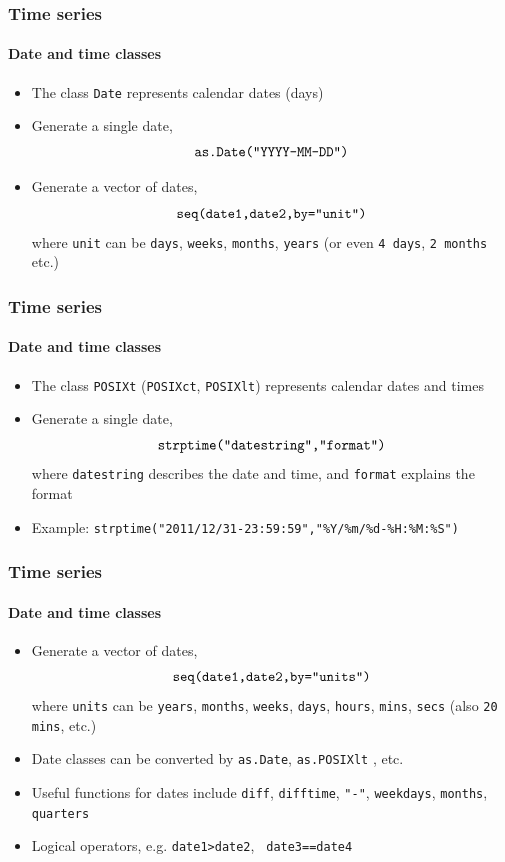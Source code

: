 \documentclass[title={Introduction to R}, author={Mutschler and Zaharieva}, inst={Institute for Econometrics and Empirical Economics}]{beamer}
\begin{document}
\begin{frame}
	\frametitle{Time series}	
	\framesubtitle{Date and time classes}	
	\begin{itemize}
		\item The class \texttt{Date} represents calendar dates (days)		
		\item Generate a single date, 
		\begin{equation*}
		\text{\texttt{as.Date("YYYY-MM-DD")}}
		\end{equation*}		
		\item Generate a vector of dates,
		\begin{equation*}
		\text{\texttt{seq(date1,date2,by="unit")}}
		\end{equation*}
		where \texttt{unit} can be \texttt{days}, \texttt{weeks}, \texttt{months}, 
		\texttt{years} \newline
		(or even \texttt{4 days}, \texttt{2 months} etc.)
	\end{itemize}
\end{frame}


\begin{frame}	
	\frametitle{Time series}	
	\framesubtitle{Date and time classes}	
	\begin{itemize}
		\item The class \texttt{POSIXt} (\texttt{POSIXct}, \texttt{POSIXlt})
		represents calendar dates and times		
		\item Generate a single date,
		\begin{equation*}
		\text{\texttt{strptime("datestring","format")}}
		\end{equation*}
		where \texttt{datestring} describes the date and time, and \texttt{format}
		explains the format		
		\item Example:\newline
		\texttt{strptime("2011/12/31-23:59:59","\%Y/\%m/\%d-\%H:\%M:\%S")}
	\end{itemize}
\end{frame}


\begin{frame}	
	\frametitle{Time series}	
	\framesubtitle{Date and time classes}	
	\begin{itemize}
		\item Generate a vector of dates,
		\begin{equation*}
		\text{\texttt{seq(date1,date2,by="units")}}
		\end{equation*}%
		where \texttt{units} can be \texttt{years}, \texttt{months}, \texttt{weeks}, 
		\texttt{days}, \texttt{hours}, \texttt{mins}, \texttt{secs} (also \texttt{20
			mins}, etc.)		
		\item Date classes can be converted by \texttt{as.Date}, \texttt{as.POSIXlt}%
		, etc.		
		\item Useful functions for dates include \texttt{diff}, \texttt{difftime}, 
		\texttt{"-"}, \texttt{weekdays}, \texttt{months}, \texttt{quarters}		
		\item Logical operators, e.g. \texttt{date1>date2}, \texttt{%
			date3==date4}
	\end{itemize}
\end{frame}
\end{document}

